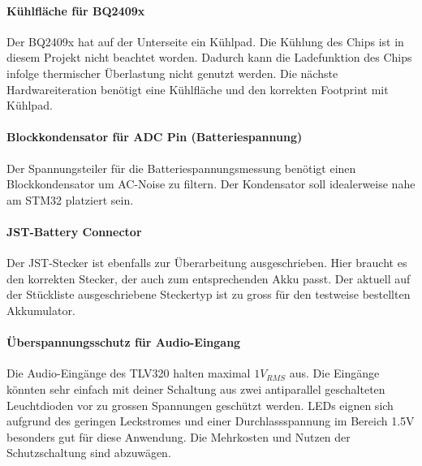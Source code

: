 \paragraph{Kühlfläche für BQ2409x}

Der BQ2409x hat auf der Unterseite ein Kühlpad. Die Kühlung des Chips ist in diesem Projekt nicht beachtet worden. Dadurch kann die Ladefunktion des Chips infolge thermischer Überlastung nicht genutzt werden. Die nächste Hardwareiteration benötigt eine Kühlfläche und den korrekten Footprint mit Kühlpad.

\paragraph{Blockkondensator für ADC Pin (Batteriespannung)}

Der Spannungsteiler für die Batteriespannungsmessung benötigt einen Blockkondensator um AC-Noise zu filtern. Der Kondensator soll idealerweise nahe am STM32 platziert sein.

\paragraph{JST-Battery Connector}

Der JST-Stecker ist ebenfalls zur Überarbeitung ausgeschrieben. Hier braucht es den korrekten Stecker, der auch zum entsprechenden Akku passt. 
Der aktuell auf der Stückliste ausgeschriebene Steckertyp ist zu gross für den testweise bestellten Akkumulator.


\paragraph{Überspannungsschutz für Audio-Eingang}

Die Audio-Eingänge des TLV320 halten maximal $1\si{V_{RMS}}$ aus. Die Eingänge könnten sehr einfach mit deiner Schaltung aus zwei antiparallel geschalteten Leuchtdioden vor zu grossen Spannungen geschützt werden. LEDs eignen sich aufgrund des geringen Leckstromes und einer Durchlassspannung im Bereich 1.5V besonders gut für diese Anwendung.
Die Mehrkosten und Nutzen der Schutzschaltung sind abzuwägen.



